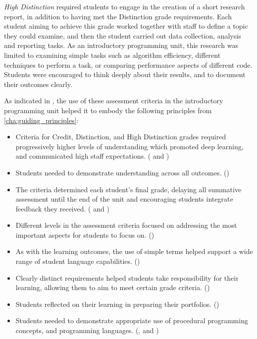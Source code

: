 \emph{High Distinction} required students to engage in the creation of a short research report, in addition to having met the Distinction grade requirements. Each student aiming to achieve this grade worked together with staff to define a topic they could examine, and then the student carried out data collection, analysis and reporting tasks. As an introductory programming unit, this research was limited to examining simple tasks such as algorithm efficiency, different techniques to perform a task, or comparing performance aspects of different code. Students were encouraged to think deeply about their results, and to document their outcomes clearly.

As indicated in , the use of these assessment criteria in the introductory programming unit helped it to embody the following principles from \cref{cha:guiding_principles}:

\begin{itemize}[noitemsep,nolistsep]
	\item Criteria for Credit, Distinction, and High Distinction grades required progressively higher levels of understanding which promoted deep learning, and communicated high staff expectations. ( and )
	\item Students needed to demonstrate understanding across all outcomes. ()
	\item The criteria determined each student's final grade, delaying all summative assessment until the end of the unit and encouraging students integrate feedback they received. ( and )
	\item Different levels in the assessment criteria focused on addressing the most important aspects for students to focus on. ()
	\item As with the learning outcomes, the use of simple terms helped support a wide range of student language capabilities. ()
	\item Clearly distinct requirements helped students take responsibility for their learning, allowing them to aim to meet certain grade criteria. ()
	\item Students reflected on their learning in preparing their portfolios. ()
	\item Students needed to demonstrate appropriate use of procedural programming concepts, and programming languages. (,  and )
\end{itemize}

